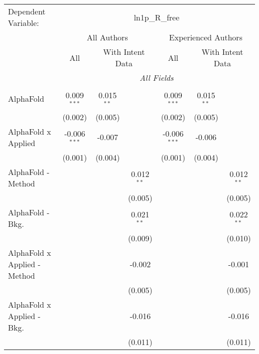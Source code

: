 \begingroup
\centering
\begin{tabular}{lcccccc}
   \tabularnewline \midrule \midrule
   Dependent Variable: & \multicolumn{6}{c}{ln1p\_R\_free}\\
 & \multicolumn{3}{c}{All Authors} & \multicolumn{3}{c}{Experienced Authors} \\
\cmidrule(lr){2-4} \cmidrule(lr){5-7}
 & \multicolumn{1}{c}{All} & \multicolumn{2}{c}{With Intent Data} & \multicolumn{1}{c}{All} & \multicolumn{2}{c}{With Intent Data} \\
\cmidrule(lr){2-2} \cmidrule(lr){3-4} \cmidrule(lr){5-5} \cmidrule(lr){6-7}
 & \multicolumn{6}{c}{\textit{All Fields}} \\ \\
   AlphaFold                    & 0.009$^{***}$  & 0.015$^{**}$ &              & 0.009$^{***}$  & 0.015$^{**}$ &   \\   
                                & (0.002)        & (0.005)      &              & (0.002)        & (0.005)      &   \\   
   AlphaFold x Applied          & -0.006$^{***}$ & -0.007       &              & -0.006$^{***}$ & -0.006       &   \\   
                                & (0.001)        & (0.004)      &              & (0.001)        & (0.004)      &   \\   
   AlphaFold - Method           &                &              & 0.012$^{**}$ &                &              & 0.012$^{**}$\\   
                                &                &              & (0.005)      &                &              & (0.005)\\   
   AlphaFold - Bkg.             &                &              & 0.021$^{**}$ &                &              & 0.022$^{**}$\\   
                                &                &              & (0.009)      &                &              & (0.010)\\   
   AlphaFold x Applied - Method &                &              & -0.002       &                &              & -0.001\\   
                                &                &              & (0.005)      &                &              & (0.005)\\   
   AlphaFold x Applied - Bkg.   &                &              & -0.016       &                &              & -0.016\\   
                                &                &              & (0.011)      &                &              & (0.011)\\   

\end{tabular}
